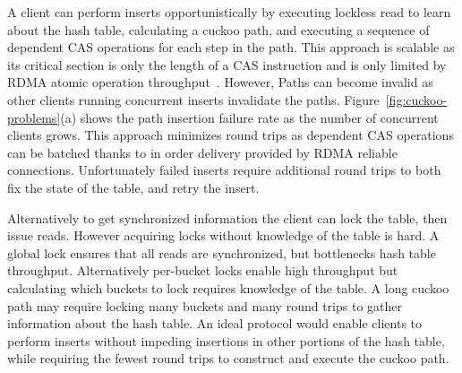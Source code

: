 A client can perform inserts opportunistically by executing
lockless read to learn about the hash table, calculating a
cuckoo path, and executing a sequence of dependent CAS
operations for each step in the path. This approach is
scalable as its critical section is only the length of a CAS
instruction and is only limited by RDMA atomic operation
throughput~\cite{design-guidelines}. However, Paths can
become invalid as other clients running concurrent inserts
invalidate the paths. Figure~\ref{fig:cuckoo-problems}(a) shows the
path insertion failure rate as the number of concurrent
clients grows. This approach minimizes round trips as
dependent CAS operations can be batched thanks to in order
delivery provided by RDMA reliable connections.
Unfortunately failed inserts require additional round trips
to both fix the state of the table, and retry the
insert.

Alternatively to get synchronized information the client can
lock the table, then issue reads. However acquiring locks
without knowledge of the table is hard. A global lock
ensures that all reads are synchronized, but bottlenecks
hash table throughput. Alternatively per-bucket locks
enable high throughput but calculating which buckets to lock
requires knowledge of the table. A long cuckoo path may
require locking many buckets and many round trips to gather
information about the hash table.
An ideal protocol would enable clients to perform inserts
without impeding insertions in other portions of the hash
table, while requiring the fewest round trips to construct
and execute the cuckoo path.


